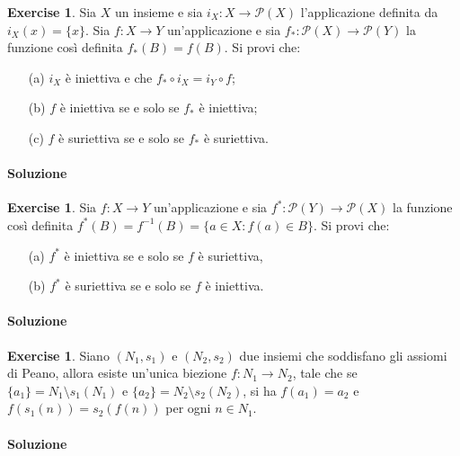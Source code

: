 \documentclass{article}
\theoremstyle{plain}
\theoremstyle{definition}
\newtheorem{xca}[exmp]{Exercise}
\theoremstyle{remark}
\begin{document}
\begin{bxthm}
\begin{xca}
Sia $X$ un insieme e sia $i_X : X \to \mathcal{P}(X)$ l'applicazione definita da 
$i_X(x) = \{x\}$. Sia $f : X \to Y$ un'applicazione e sia $f_* : \mathcal{P}(X) \to \mathcal{P}(Y)$ 
la funzione così definita $f_*(B) = f(B)$. Si provi che:
\begin{itemize}
    \item[(a)] $i_X$ è iniettiva e che $f_* \circ i_X = i_Y \circ f$;
    \item[(b)] $f$ è iniettiva se e solo se $f_*$ è iniettiva;
    \item[(c)] $f$ è suriettiva se e solo se $f_*$ è suriettiva.
\end{itemize}
\end{xca}
\end{bxthm}
\paragraph{Soluzione}

\begin{bxthm}
\begin{xca}
Sia $f : X \to Y$ un'applicazione e sia 
$f^* : \mathcal{P}(Y) \to \mathcal{P}(X)$ la funzione così definita 
$f^*(B) = f^{-1}(B) = \{a \in X : f(a) \in B\}$. Si provi che:
\begin{itemize}
    \item[(a)] $f^*$ è iniettiva se e solo se $f$ è suriettiva,
    \item[(b)] $f^*$ è suriettiva se e solo se $f$ è iniettiva.
\end{itemize}
\end{xca}
\end{bxthm}
\paragraph{Soluzione}

\begin{bxthm}
\begin{xca}
Siano $(N_1, s_1)$ e $(N_2, s_2)$ due insiemi che soddisfano gli assiomi di 
Peano, allora esiste un'unica biezione $f : N_1 \to N_2$, tale che se 
$\{a_1\} = N_1 \setminus s_1(N_1)$ e $\{a_2\} = N_2 \setminus s_2(N_2)$, 
si ha $f(a_1) = a_2$ e $f(s_1(n)) = s_2(f(n))$ per ogni $n \in N_1$.
\end{xca}
\end{bxthm}
\paragraph{Soluzione}
\end{document}
